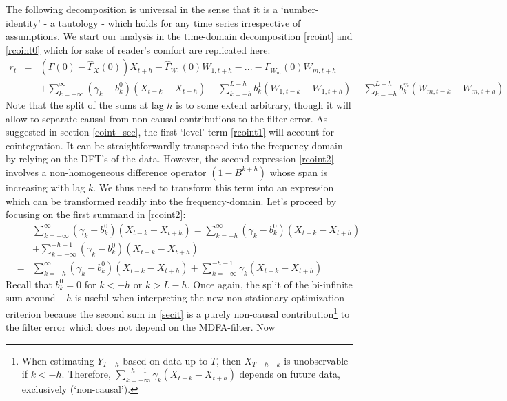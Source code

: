 \documentclass[11pt]{article}
\begin{document}
The following decomposition is universal in the sense that it is a `number-identity' - a tautology - which holds for any time series irrespective of assumptions.  
We start our analysis in the time-domain decomposition \ref{rcoint} and \ref{rcoint0} which for sake of reader's comfort are replicated here:
\begin{eqnarray}
r_{t}&=&(\Gamma(0)-\hat{\Gamma}_X(0))X_{t+h}-\hat{\Gamma}_{W_1}(0)W_{1,t+h}-...-\hat{\Gamma}_{W_m}(0)W_{m,t+h}\label{rcoint1}\\
&&+\sum_{k=-\infty}^\infty(\gamma_{k}-b_k^0)(X_{t-k}-X_{t+h})-\sum_{k=-h}^{L-h}b_{k}^1 (W_{1,t-k}-W_{1,t+h})-\sum_{k=-h}^{L-h}b_{k}^m(W_{m,t-k}-W_{m,t+h})\label{rcoint2}
\end{eqnarray}
Note that the split of the sums at lag $h$ is to some extent arbitrary, though it will allow to separate causal from non-causal contributions to the filter error. As suggested in section \ref{coint_sec}, the first `level'-term \ref{rcoint1} will account for cointegration. It can  be straightforwardly transposed into the frequency domain by relying on the DFT's of the data. However, the second expression \ref{rcoint2} involves a  non-homogeneous difference operator $(1-B^{k+h})$ whose span is increasing with lag $k$. We thus need to transform this term into an  expression which can be transformed readily into the frequency-domain. Let's proceed by focusing on the first summand in \ref{rcoint2}:
\begin{eqnarray}
&&\sum_{k=-\infty}^\infty({\gamma}_{k}-b_k^0)(X_{t-k}-X_{t+h})=\sum_{k=-h}^{\infty}({\gamma}_{k}-b_k^0)(X_{t-k}-X_{t+h})\nonumber\\
&&+\sum_{k=-\infty}^{-h-1}(\gamma_{k}-b_k^0)(X_{t-k}-X_{t+h})\nonumber\\
&=&\sum_{k=-h}^{\infty}({\gamma}_{k}-b_k^0)(X_{t-k}-X_{t+h})+\sum_{k=-\infty}^{-h-1}\gamma_{k}(X_{t-k}-X_{t+h})\label{secit}
\end{eqnarray}
Recall that $b_k^0=0$ for $k<-h$ or $k>L-h$. Once again, the split of the bi-infinite sum around $-h$ is useful when interpreting the new non-stationary optimization criterion because the second sum in \ref{secit} is a purely non-causal contribution\footnote{When estimating $Y_{T-h}$ based on data up to $T$, then $X_{T-h-k}$ is unobservable  if $k<-h$. Therefore, $\sum_{k=-\infty}^{-h-1}\gamma_{k}(X_{t-k}-X_{t+h})$ depends on future data, exclusively (`non-causal').} to the filter error which does not depend on the MDFA-filter.  Now
\end{document}
